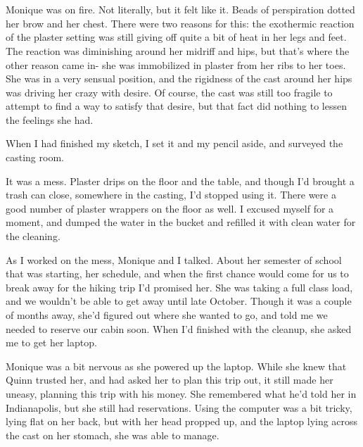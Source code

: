 \chapter{~}
\begin{thought}
Monique was on fire. Not literally, but it felt like it. Beads of perspiration dotted her
brow and her chest. There were two reasons for this: the exothermic reaction of the plaster
setting was still giving off quite a bit of heat in her legs and feet. The reaction was
diminishing around her midriff and hips, but that's where the other reason came in- she was
immobilized in plaster from her ribs to her toes. She was in a very sensual position, and the
rigidness of the cast around her hips was driving her crazy with desire. Of course, the cast was
still too fragile to attempt to find a way to satisfy that desire, but that fact did nothing to
lessen the feelings she had.
\end{thought}

When I had finished my sketch, I set it and my pencil aside, and surveyed the casting room.

It was a mess. Plaster drips on the floor and the table, and though I'd brought a trash can
close, somewhere in the casting, I'd stopped using it. There were a good number of plaster
wrappers on the floor as well. I excused myself for a moment, and dumped the water in the bucket
and refilled it with clean water for the cleaning.

As I worked on the mess, Monique and I talked. About her semester of school that was
starting, her schedule, and when the first chance would come for us to break away for the hiking
trip I'd promised her. She was taking a full class load, and we wouldn't be able to get away
until late October. Though it was a couple of months away, she'd figured out where she wanted to
go, and told me we needed to reserve our cabin soon. When I'd finished with the cleanup, she
asked me to get her laptop.

\begin{thought}
Monique was a bit nervous as she powered up the laptop. While she knew that Quinn trusted
her, and had asked her to plan this trip out, it still made her uneasy, planning this trip with
his money. She remembered what he'd told her in Indianapolis, but she still had reservations.
Using the computer was a bit tricky, lying flat on her back, but with her head propped up, and
the laptop lying across the cast on her stomach, she was able to manage.
\end{thought}

